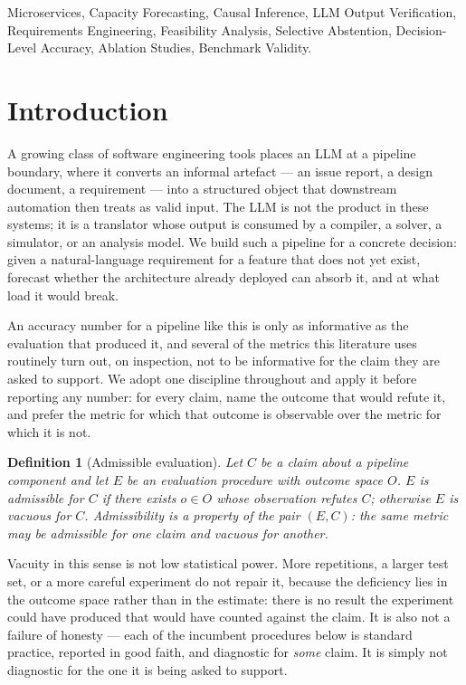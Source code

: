 \documentclass[journal, 10pt]{IEEEtran}
\newtheorem{definition}{Definition}
\begin{document}
\begin{IEEEkeywords}
Microservices, Capacity Forecasting, Causal Inference, LLM Output Verification, Requirements Engineering, Feasibility Analysis, Selective Abstention, Decision-Level Accuracy, Ablation Studies, Benchmark Validity.
\end{IEEEkeywords}

\section{Introduction}
\label{sec:introduction}

A growing class of software engineering tools places an LLM at a pipeline
boundary, where it converts an informal artefact --- an issue report, a design
document, a requirement --- into a structured object that downstream automation
then treats as valid input. The LLM is not the product in these systems; it is a
translator whose output is consumed by a compiler, a solver, a simulator, or an
analysis model. We build such a pipeline for a concrete decision: given a
natural-language requirement for a feature that does not yet exist, forecast
whether the architecture already deployed can absorb it, and at what load it
would break.

An accuracy number for a pipeline like this is only as informative as the
evaluation that produced it, and several of the metrics this literature uses
routinely turn out, on inspection, not to be informative for the claim they are
asked to support. We adopt one discipline throughout and apply it before
reporting any number: for every claim, name the outcome that would refute it,
and prefer the metric for which that outcome is observable over the metric for
which it is not.

\begin{definition}[Admissible evaluation]
\label{def:admissible}
Let $C$ be a claim about a pipeline component and let $E$ be an evaluation
procedure with outcome space $O$. $E$ is \emph{admissible} for $C$ if there
exists $o \in O$ whose observation refutes $C$; otherwise $E$ is \emph{vacuous}
for $C$. Admissibility is a property of the pair $(E,C)$: the same metric may be
admissible for one claim and vacuous for another.
\end{definition}

Vacuity in this sense is not low statistical power. More repetitions, a larger
test set, or a more careful experiment do not repair it, because the deficiency
lies in the outcome space rather than in the estimate: there is no result the
experiment could have produced that would have counted against the claim. It is
also not a failure of honesty --- each of the incumbent procedures below is
standard practice, reported in good faith, and diagnostic for \emph{some} claim.
It is simply not diagnostic for the one it is being asked to support.
\end{document}
